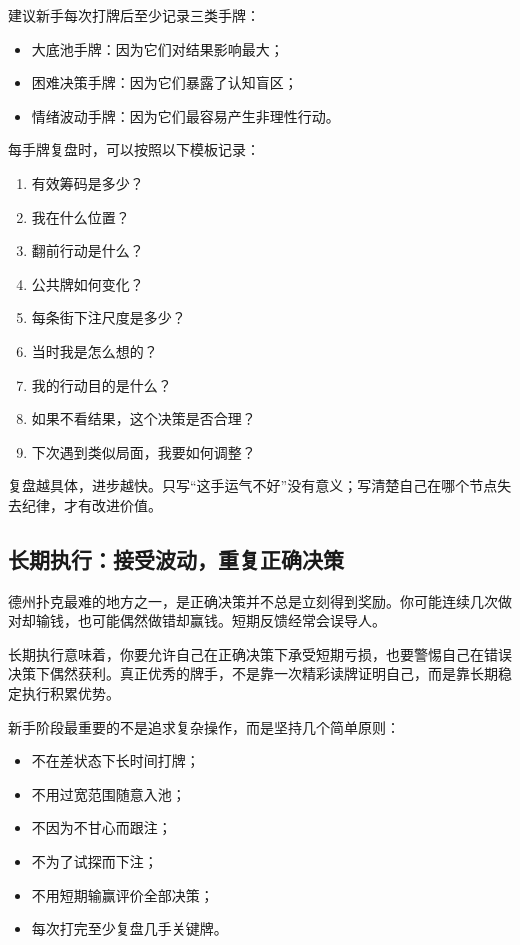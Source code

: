 建议新手每次打牌后至少记录三类手牌：

\begin{itemize}
\item 大底池手牌：因为它们对结果影响最大；
\item 困难决策手牌：因为它们暴露了认知盲区；
\item 情绪波动手牌：因为它们最容易产生非理性行动。
\end{itemize}

每手牌复盘时，可以按照以下模板记录：

\begin{enumerate}
\item 有效筹码是多少？
\item 我在什么位置？
\item 翻前行动是什么？
\item 公共牌如何变化？
\item 每条街下注尺度是多少？
\item 当时我是怎么想的？
\item 我的行动目的是什么？
\item 如果不看结果，这个决策是否合理？
\item 下次遇到类似局面，我要如何调整？
\end{enumerate}

复盘越具体，进步越快。只写“这手运气不好”没有意义；写清楚自己在哪个节点失去纪律，才有改进价值。

\subsection{长期执行：接受波动，重复正确决策}

德州扑克最难的地方之一，是正确决策并不总是立刻得到奖励。你可能连续几次做对却输钱，也可能偶然做错却赢钱。短期反馈经常会误导人。

长期执行意味着，你要允许自己在正确决策下承受短期亏损，也要警惕自己在错误决策下偶然获利。真正优秀的牌手，不是靠一次精彩读牌证明自己，而是靠长期稳定执行积累优势。

新手阶段最重要的不是追求复杂操作，而是坚持几个简单原则：

\begin{itemize}
\item 不在差状态下长时间打牌；
\item 不用过宽范围随意入池；
\item 不因为不甘心而跟注；
\item 不为了试探而下注；
\item 不用短期输赢评价全部决策；
\item 每次打完至少复盘几手关键牌。
\end{itemize}

